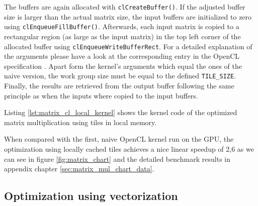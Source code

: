 The buffers are again allocated with \lstinline!clCreateBuffer()!. If the adjusted buffer size is larger than the actual matrix size, the input buffers are initialized to zero using \lstinline!clEnqueueFillBuffer()!. Afterwards, each input matrix is copied to a rectangular region (as large as the input matrix) in the top left corner of the allocated buffer using \lstinline!clEnqueueWriteBufferRect!. For a detailed explanation of the arguments please have a look at the corresponding entry in the OpenCL specification \cite[p.76]{opencl_spec}. Apart form the kernel's arguments which equal the ones of the naive version, the work group size must be equal to the defined \lstinline!TILE_SIZE!. Finally, the results are retrieved from the output buffer following the same principle as when the inputs where copied to the input buffers.

Listing \ref{lst:matrix_cl_local_kernel} shows the kernel code of the optimized matrix multiplication using tiles in local memory.



When compared with the first, naive OpenCL kernel run on the GPU, the optimization using locally cached tiles achieves a nice linear speedup of 2,6 as we can see in figure \ref{fig:matrix_chart} and the detailed benchmark results in appendix chapter \ref{sec:matrix_mul_chart_data}.



\subsection{Optimization using vectorization}





